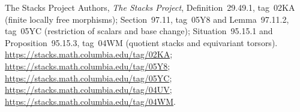  The Stacks Project Authors,
\emph{The Stacks Project},
Definition~29.49.1, tag~02KA (finite locally free morphisms);
Section~97.11, tag~05Y8 and Lemma~97.11.2, tag~05YC
(restriction of scalars and base change);
Situation~95.15.1 and Proposition~95.15.3, tag~04WM
(quotient stacks and equivariant torsors).
\url{https://stacks.math.columbia.edu/tag/02KA};
\url{https://stacks.math.columbia.edu/tag/05Y8};
\url{https://stacks.math.columbia.edu/tag/05YC};
\url{https://stacks.math.columbia.edu/tag/04UV};
\url{https://stacks.math.columbia.edu/tag/04WM}.
